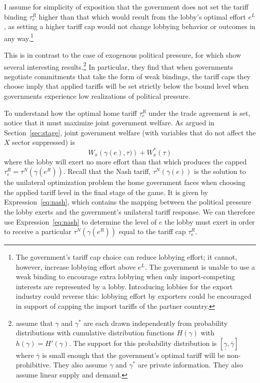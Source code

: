 \documentclass[12pt]{article}
\newcommand{\ov}{\overline}
\newcommand{\un}{\underline}
\newcommand{\ga}{\gamma}
\begin{document}
I assume for simplicity of exposition that the government does not set the tariff binding $\tau_e^R$ higher than that which would result from the lobby's optimal effort $e^L$, as setting a higher tariff cap would not change lobbying behavior or outcomes in any way.\footnote{The government's tariff cap choice can reduce lobbying effort; it cannot, however, increase lobbying effort above $e^L$. The government is unable to use a weak binding to encourage extra lobbying when only import-competing interests are represented by a lobby. Introducing lobbies for the export industry could reverse this: lobbying effort by exporters could be encouraged in support of capping the import tariffs of the partner country.}

This is in contrast to the case of exogenous political pressure, for which \Textcite{bs2005} show several interesting results.\footnote{\Textcite{bs2005} assume that $\ga$ and $\ga^*$ are each drawn independently from probability distributions with cumulative distribution functions $H(\ga)$ with $h(\ga)=H'(\ga)$. The support for this probability distribution is $\left[\un{\ga}, \ov{\ga} \right]$ where $\ov{\ga}$ is small enough that the government's optimal tariff will be non-prohibitive. They also assume $\ga$ and $\ga^*$ are private information. They also assume linear supply and demand.} In particular, they find that when governments negotiate commitments that take the form of weak bindings, the tariff caps they choose imply that applied tariffs will be set strictly below the bound level when governments experience low realizations of political pressure.

To understand how the optimal home tariff $\tau_e^R$ under the trade agreement is set, notice that it must maximize joint government welfare. As argued in Section~\ref{sec:stage}, joint government welfare (with variables that do not affect the $X$ sector suppressed) is
  \begin{equation}
		W_x \left(\ga(e),\tau) \right) + W_x^*\left(\tau \right)
	  \label{exp:1}
	\end{equation}
where the lobby will exert no more effort than that which produces the capped $\tau_e^R=\tau^N(\ga(e^R))$. Recall that the Nash tariff, $\tau^N(\ga(e))$ is the solution to the unilateral optimization problem the home government faces when choosing the applied tariff level in the final stage of the game. It is given by Expression~\ref{eq:nash}, which contains the mapping between the political pressure the lobby exerts and the government's unilateral tariff response. We can therefore use Expression~\ref{eq:nash} to determine the level of $e$ the lobby must exert in order to receive a particular $\tau^N(\ga(e^R))$ equal to the tariff cap $\tau_e^R$.
\end{document}
